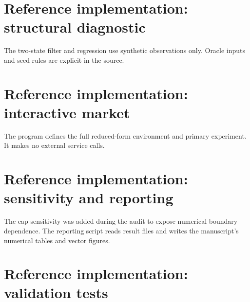 \section{Reference implementation: structural diagnostic}
The two-state filter and regression use synthetic observations only. Oracle inputs and seed rules are explicit in the source.

\clearpage
\section{Reference implementation: interactive market}
The program defines the full reduced-form environment and primary experiment. It makes no external service calls.

\clearpage
\section{Reference implementation: sensitivity and reporting}
The cap sensitivity was added during the audit to expose numerical-boundary dependence. The reporting script reads result files and writes the manuscript's numerical tables and vector figures.


\section{Reference implementation: validation tests}



